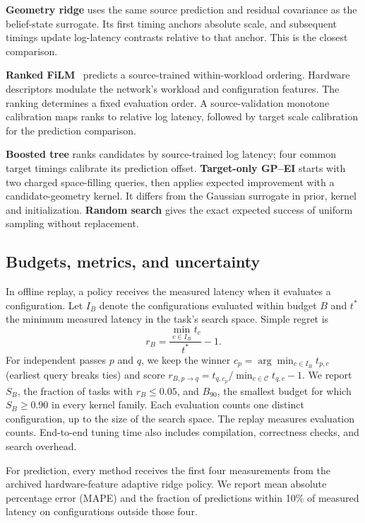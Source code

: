 \documentclass[conference]{IEEEtran}
\begin{document}
\textbf{Geometry ridge} uses the same source prediction and residual
covariance as the belief-state surrogate. Its first timing anchors absolute
scale, and subsequent timings update log-latency contrasts relative to that
anchor. This is the closest comparison.

\textbf{Ranked FiLM}~\cite{film} predicts a source-trained within-workload ordering.
Hardware descriptors modulate the network's workload and configuration
features. The ranking determines a fixed evaluation order. A source-validation
monotone calibration maps ranks to relative log latency, followed by target
scale calibration for the prediction comparison.

\textbf{Boosted tree} ranks candidates by source-trained log latency;
four common target timings calibrate its prediction offset.
\textbf{Target-only GP--EI} starts with two charged space-filling
queries, then applies expected improvement with a candidate-geometry
kernel. It differs from the Gaussian surrogate in prior, kernel and
initialization. \textbf{Random search} gives the exact expected success
of uniform sampling without replacement.

\subsection{Budgets, metrics, and uncertainty}
In offline replay, a policy receives the measured latency when it
evaluates a configuration. Let $I_B$ denote the configurations evaluated
within budget $B$ and $t^*$ the minimum measured latency in the task's
search space. Simple regret is
\begin{equation}
 r_B = \frac{\min_{c\in I_B}t_c}{t^*}-1 .
\end{equation}
For independent passes $p$ and $q$, we keep the winner
$c_p=\arg\min_{c\in I_B}t_{p,c}$ (earliest query breaks ties) and score
$r_{B,p\to q}=t_{q,c_p}/\min_{c\in\mathcal C} t_{q,c}-1$.
We report $S_B$, the fraction of tasks with $r_B\leq0.05$, and $B_{90}$,
the smallest budget for which $S_B\geq0.90$ in every kernel family.
Each evaluation counts one distinct configuration, up to the size of the
search space. The replay measures evaluation counts. End-to-end tuning
time also includes compilation, correctness checks, and search overhead.

For prediction, every method receives the first four measurements from
the archived hardware-feature adaptive ridge policy. We report mean
absolute percentage error (MAPE) and the fraction of predictions within
10\% of measured latency on configurations outside those four.
\end{document}
